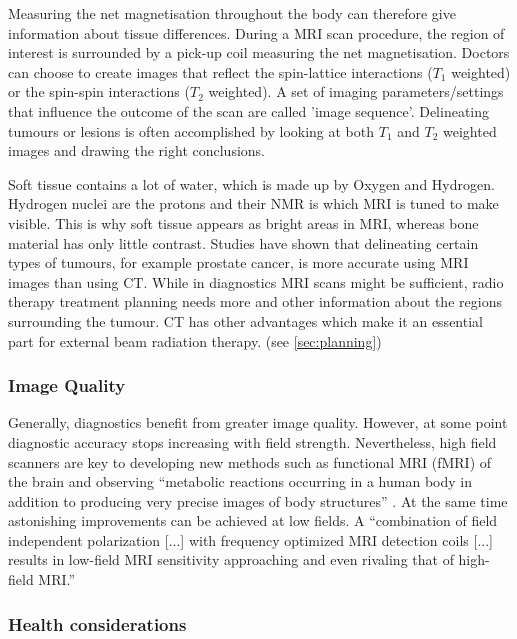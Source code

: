 Measuring the net magnetisation throughout the body can therefore give information about tissue differences.
During a MRI scan procedure, the region of interest is surrounded by a pick-up coil measuring the net magnetisation.
Doctors can choose to create images that reflect the spin-lattice interactions ($T_1$ weighted) or the spin-spin interactions ($T_2$ weighted). 
A set of imaging parameters/settings that influence the outcome of the scan are called 'image sequence'.
Delineating tumours or lesions is often accomplished by looking at both $T_1$ and $T_2$ weighted images and drawing the right conclusions.

Soft tissue contains a lot of water, which is made up by Oxygen and Hydrogen. Hydrogen nuclei are the protons and their NMR is which MRI is tuned to make visible. This is why soft tissue appears as bright areas in MRI, whereas bone material has only little contrast. \cite{Currie2013}
Studies have shown that delineating certain types of tumours, for example prostate cancer, is more accurate using MRI images than using CT. \cite{Rasch1999, Debois1999a, Roach1996}
While in diagnostics MRI scans might be sufficient, radio therapy treatment planning needs more and other information about the regions surrounding the tumour. CT has other advantages which make it an essential part for external beam radiation therapy. (see \ref{sec:planning})


\subsubsection{Image Quality}
Generally, diagnostics benefit from greater image quality.
However, at some point diagnostic accuracy stops increasing with field strength.
Nevertheless, high field scanners are key to developing new methods such as functional MRI (fMRI) of the brain \cite{Duyn2012} and observing ``metabolic reactions occurring in a human body in addition to producing very precise images of body structures'' \cite{Wada2010}.
At the same time astonishing improvements can be achieved at low fields.
A ``combination of field independent polarization [...] with frequency optimized MRI detection coils [...] results in low-field MRI sensitivity approaching and even rivaling that of high-field MRI.'' \cite{Coffey2013}

\subsubsection{Health considerations}

